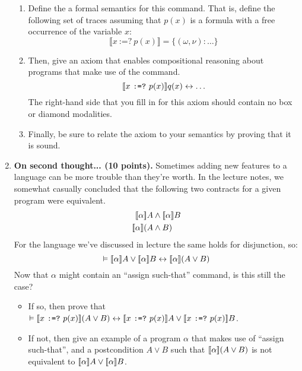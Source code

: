 \documentclass[10pt]{article}
\begin{document}
\begin{enumerate}
\begin{enumerate}
\item Define the a formal semantics for this command.
That is, define the following set of traces assuming that $p(x)$ is a formula with a free occurrence of the variable $x$:
\[
\llbracket x~\texttt{:=?}~p(x)\rrbracket = 
\{
(\omega,\nu) : \ldots
\}
\]

\item Then, give an axiom that enables compositional reasoning about programs that make use of the command.
\[
\dbox{x~\texttt{:=?}~p(x)}q(x) \lbisubjunct \ldots
\]
The right-hand side that you fill in for this axiom should contain no box or diamond modalities.

\item
Finally, be sure to relate the axiom to your semantics by proving that it is sound.
\end{enumerate}

\newpage

\item \textbf{On second thought... (10 points).}
Sometimes adding new features to a language can be more trouble than they're worth.
In the lecture notes, we somewhat casually concluded that the following two contracts for a given program were equivalent.
\begin{align*}
\dbox{\alpha}{A} &\land \dbox{\alpha}{B} \\
\dbox{\alpha}{(A &\land B)}
\end{align*}
For the language we've discussed in lecture the same holds for disjunction, so:
\[
\vDash \dbox{\alpha}{A} \lor \dbox{\alpha}{B} \lbisubjunct
\dbox{\alpha}{(A \lor B)}
\]
Now that $\alpha$ might contain an ``assign such-that'' command, is this still the case?
\begin{itemize}
\item If so, then prove that
$
\vDash \dbox{x~\texttt{:=?}~p(x)}{(A \lor B)} \lbisubjunct \dbox{x~\texttt{:=?}~p(x)}{A} \lor \dbox{x~\texttt{:=?}~p(x)}{B}
$.

\item If not, then give an example of a program $\alpha$ that makes use of ``assign such-that'', and a postcondition $A \lor B$ such that $\dbox{\alpha}{(A \lor B)}$ is not equivalent to $\dbox{\alpha}{A} \lor \dbox{\alpha}{B}$.
\end{itemize}

\end{enumerate}
\end{document}
